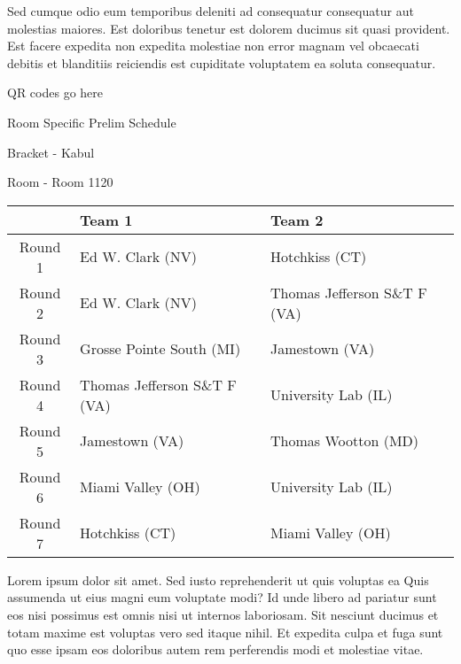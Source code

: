 \documentclass{article}%
\begin{document}
\newline%
Sed cumque odio eum temporibus deleniti ad consequatur consequatur aut molestias maiores. Est doloribus tenetur est dolorem ducimus sit quasi provident. Est facere expedita non expedita molestiae non error magnam vel obcaecati debitis et blanditiis reiciendis est cupiditate voluptatem ea soluta consequatur.%
\vspace*{140pt}%
\begin{center}%
\begin{Huge}%
QR codes go here%
\end{Huge}%
\end{center}%
\newpage%
\begin{center}%
\begin{Huge}%
Room Specific Prelim Schedule%
\end{Huge}%
\vspace*{8pt}%
\linebreak%
\begin{Large}%
Bracket {-} Kabul%
\end{Large}%
\vspace*{8pt}%
\linebreak%
\vspace*{8pt}%
\begin{Large}%
Room {-} Room 1120%
\end{Large}%
\end{center}%
%
\begin{tabularx}{\textwidth}{|c|Y|Y|}%
\hline%
&Team 1&Team 2\\%
\hline%
Round 1&Ed W. Clark (NV)&Hotchkiss (CT)\\%
Round 2&Ed W. Clark (NV)&Thomas Jefferson S\&T F (VA)\\%
Round 3&Grosse Pointe South (MI)&Jamestown (VA)\\%
Round 4&Thomas Jefferson S\&T F (VA)&University Lab (IL)\\%
Round 5&Jamestown (VA)&Thomas Wootton (MD)\\%
Round 6&Miami Valley (OH)&University Lab (IL)\\%
Round 7&Hotchkiss (CT)&Miami Valley (OH)\\%
\hline%
\end{tabularx}%
\vspace*{8pt}%
\newline%
Lorem ipsum dolor sit amet. Sed iusto reprehenderit ut quis voluptas ea Quis assumenda ut eius magni eum voluptate modi? Id unde libero ad pariatur sunt eos nisi possimus est omnis nisi ut internos laboriosam. Sit nesciunt ducimus et totam maxime est voluptas vero sed itaque nihil. Et expedita culpa et fuga sunt quo esse ipsam eos doloribus autem rem perferendis modi et molestiae vitae.\newline%
\end{document}
